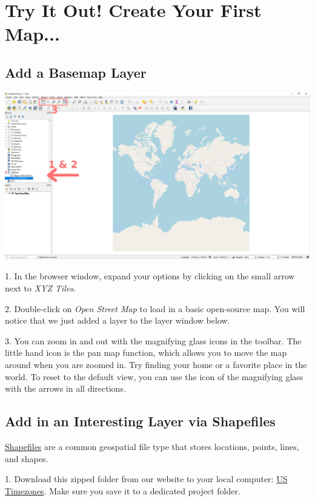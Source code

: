 \documentclass[oneside,a4paper,11pt,explicit]{book}
\begin{document}
\section{Try It Out! Create Your First Map...}

\subsection{Add a Basemap Layer}

\centerline{\includegraphics[width=\textwidth]{QGISbasemap.png}}

1. In the browser window, expand your options by clicking on the small arrow next to \textit{XYZ Tiles}.

2. Double-click on \textit{Open Street Map} to load in a basic open-source map. You will notice that we just added a layer to the layer window below.

3. You can zoom in and out with the magnifying glass icons in the toolbar. The little hand icon is the pan map function, which allows you to move the map around when you are zoomed in. Try finding your home or a favorite place in the world. To reset to the default view, you can use the icon of the magnifying glass with the arrows in all directions. 

\subsection{Add in an Interesting Layer via Shapefiles}

\href{https://en.wikipedia.org/wiki/Shapefile}{Shapefiles} are a common geospatial file type that stores locations, points, lines, and shapes.

1. Download this zipped folder from our website to your local computer:  \href{https://jeremydforsythe.github.io/icecream-tutorials/Tutorial2_MakingBasicMapsInQGIS/Time_Zones.zip}{US Timezones}. Make sure you save it to a dedicated project folder.
\end{document}
